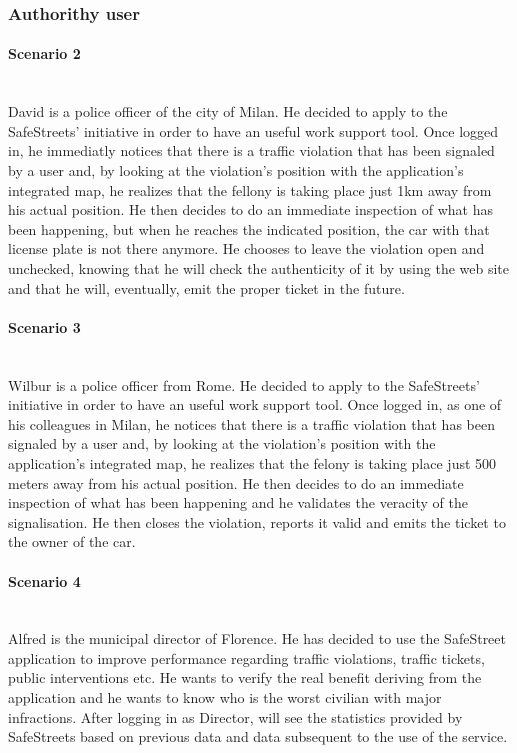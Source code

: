 \documentclass{article}
\begin{document}
\subsubsection{Authorithy user}
\paragraph{Scenario 2}\mbox{}\\
David is a police officer of the city of Milan. He decided to apply to the
SafeStreets’ initiative in order to have an useful work support tool. Once
logged in, he immediatly notices that there is a traffic violation that has been
signaled by a user and, by looking at the violation’s position with the
application’s integrated map, he realizes that the fellony is taking place just
1km away from his actual position. He then decides to do an immediate inspection
of what has been happening, but when he reaches the indicated position, the car
with that license plate is not there anymore. He chooses to leave the violation
open and unchecked, knowing that he will check the authenticity of it by using
the web site and that he will, eventually, emit the proper ticket in the future.
\paragraph{Scenario 3}\mbox{}\\
Wilbur is a police officer from Rome. He decided to
apply to the SafeStreets’ initiative in order to have an useful work support
tool. Once logged in, as one of his colleagues in Milan, he notices that there
is a traffic violation that has been signaled by a user and, by looking at the
violation’s position with the application’s integrated map, he realizes that the
felony is taking place just 500 meters away from his actual position. He then
decides to do an immediate inspection of what has been happening and he
validates the veracity of the signalisation. He then closes the violation,
reports it valid and emits the ticket to the owner of the car.
\paragraph{Scenario 4}\mbox{}\\
Alfred is the municipal director of Florence. He has decided to use the SafeStreet 
application to improve performance regarding traffic violations, traffic tickets, 
public interventions etc.
He wants to verify the real benefit deriving from the application and he wants to know
who is the worst civilian with major infractions. 
After logging in as Director, will see the statistics provided by SafeStreets based 
on previous data and data subsequent to the use of the service.
\end{document}
